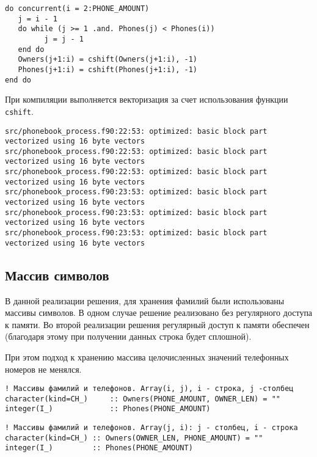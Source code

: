 \documentclass[a4paper,14pt]{article}
\begin{document}
\begin{lstlisting}[caption={Сортировка методом вставок}, label={lst:example}]
do concurrent(i = 2:PHONE_AMOUNT)
   j = i - 1
   do while (j >= 1 .and. Phones(j) < Phones(i))
         j = j - 1
   end do
   Owners(j+1:i) = cshift(Owners(j+1:i), -1)
   Phones(j+1:i) = cshift(Phones(j+1:i), -1)
end do
\end{lstlisting}

При компиляции выполняется векторизация за счет использования функции \texttt{cshift}.

\begin{lstlisting}[caption={Векторизация при компиляции}]
src/phonebook_process.f90:22:53: optimized: basic block part vectorized using 16 byte vectors
src/phonebook_process.f90:22:53: optimized: basic block part vectorized using 16 byte vectors
src/phonebook_process.f90:22:53: optimized: basic block part vectorized using 16 byte vectors
src/phonebook_process.f90:23:53: optimized: basic block part vectorized using 16 byte vectors
src/phonebook_process.f90:23:53: optimized: basic block part vectorized using 16 byte vectors
src/phonebook_process.f90:23:53: optimized: basic block part vectorized using 16 byte vectors
\end{lstlisting}

\subsection{Массив символов}

В данной реализации решения, для хранения фамилий были использованы массивы символов. В одном случае решение реализовано без регулярного доступа к памяти. Во второй реализации решения регулярный доступ к памяти обеспечен (благодаря этому при получении данных строка будет сплошной).

При этом подход к хранению массива целочисленных значений телефонных номеров не менялся. 

\begin{lstlisting}[caption={Инициализация массивов с нерегулярным доступом}]
! Массивы фамилий и телефонов. Array(i, j), i - строка, j -столбец 
character(kind=CH_)     :: Owners(PHONE_AMOUNT, OWNER_LEN) = ""
integer(I_)             :: Phones(PHONE_AMOUNT)
\end{lstlisting}

\begin{lstlisting}[caption={Инициализация массивов с регулярным доступом}]
! Массивы фамилий и телефонов. Array(j, i): j - столбец, i - строка
character(kind=CH_) :: Owners(OWNER_LEN, PHONE_AMOUNT) = ""
integer(I_)         :: Phones(PHONE_AMOUNT)
\end{lstlisting}
\end{document}
